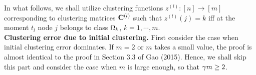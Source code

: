 In what follows, we shall utilize clustering functions $z^{(l)}: [n] \to [m]$
corresponding to clustering matrices $\mathbf{C}^{(l)}$  such that  $z^{(l)} (j) = k$ 
iff at the moment $t_l$ node $j$ belongs to class $\Omega_k$, $k=1, \cdots, m$. 
 \\

 


{\bf Clustering error due to initial clustering. } 
First consider the case when initial clustering error dominates. 
If $m=2$ or $m$ takes a small value, the proof is almost identical to the proof in Section 3.3 of  Gao \etal (2015).
Hence, we shall skip this part and consider the case when $m$ is large enough,
so that $\gamma m \geq 2$.
 
